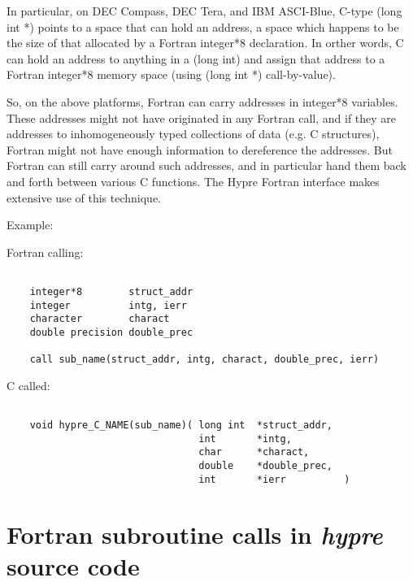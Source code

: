 \vspace{0.1in}


In particular, on DEC Compass, DEC Tera, and IBM ASCI-Blue, C-type
(long int *) points to a space that can hold an address, a space which
happens to be the size of that allocated by a Fortran integer*8 declaration.
In orther words, C can hold an address to anything in a (long int) and
assign that address to a Fortran integer*8 memory space (using (long int *)
call-by-value).

So, on the above platforms, Fortran can carry addresses in integer*8
variables.  These addresses might not have originated in any Fortran call,
and if they are addresses to inhomogeneously typed collections of data
(e.g. C structures), Fortran might not have enough information to dereference
the addresses.  But Fortran can still carry around such addresses, and in
particular hand them back and forth between various C functions.  The Hypre
Fortran interface makes extensive use of this technique.

\vspace{0.2in}

\noindent Example:

\vspace{0.1in}

  Fortran calling:
\begin{verbatim}

    integer*8        struct_addr
    integer          intg, ierr
    character        charact
    double precision double_prec

    call sub_name(struct_addr, intg, charact, double_prec, ierr)

\end{verbatim}
  C called:
\begin{verbatim}

    void hypre_C_NAME(sub_name)( long int  *struct_addr,
                                 int       *intg,
                                 char      *charact,
                                 double    *double_prec,
                                 int       *ierr          )

\end{verbatim}

\section{Fortran subroutine calls in {\itshape hypre} source code}

\vspace{0.2in}


